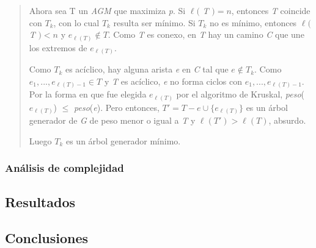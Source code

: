 \begin{itemize}
\begin{quotation}
\quad Ahora sea T un \textit{AGM} que maximiza \textit{p}. Si $\ell($ \textit{T} $) = n $, entonces \textit{T} coincide con $ T_k $, con lo cual $ T_k $ resulta ser m\'inimo. Si $ T_k $ no es m\'inimo, entonces $\ell($ \textit{T} $) < n $ y $ e_{\ell(T)} \notin T $. Como \textit{T} es conexo, en \textit{T} hay un camino \textit{C} que une los extremos de $ e_{\ell(T)} $.

\quad Como $ T_k $ es ac\'iclico, hay alguna arista \textit{e} en \textit{C} tal que $ e\notin T_k $. Como $ e_1, ..., e_{\ell(T) - 1} \in T $ y \textit{T} es ac\'iclico, \textit{e} no forma ciclos con $ e_1, ..., e_{\ell(T) - 1} $.
Por la forma en que fue elegida $ e_{\ell(T)} $ por el algoritmo de Kruskal, \textit{peso}($e_{\ell(T)}$) $ \leq $ \textit{peso}(\textit{e}).
Pero entonces, $ T' = T - e \cup \lbrace e_{\ell(T)} \rbrace $ es un \'arbol generador de \textit{G} de peso menor o igual a \textit{T} y $ \ell(T') > \ell(T)$, absurdo.

\quad Luego $ T_k $ es un \'arbol generador m\'inimo.

\end{quotation} 


\quad 

\end{itemize}

\subsubsection{An\'alisis de complejidad}




\subsection{Resultados}



\subsection{Conclusiones}

